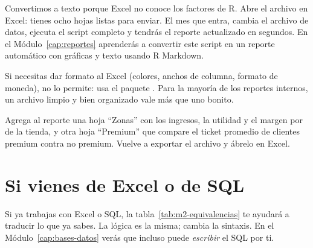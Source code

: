 Convertimos  a texto porque Excel no conoce los factores
de R. Abre el archivo en Excel: tienes ocho hojas listas para enviar. El mes
que entra, cambia el archivo de datos, ejecuta el script completo y tendrás
el reporte actualizado en segundos. En el Módulo~\ref{cap:reportes}
aprenderás a convertir este script en un reporte automático con gráficas y
texto usando R Markdown.

\begin{consejo}
Si necesitas dar formato al Excel (colores, anchos de columna, formato de
moneda),  no lo permite: usa el paquete .
Para la mayoría de los reportes internos, un archivo limpio y bien
organizado vale más que uno bonito.
\end{consejo}

\begin{hazlotu}
Agrega al reporte una hoja ``Zonas'' con los ingresos, la utilidad y el
margen por  de la tienda, y otra hoja ``Premium'' que compare el
ticket promedio de clientes premium contra no premium. Vuelve a exportar el
archivo y ábrelo en Excel.
\end{hazlotu}

\section{Si vienes de Excel o de SQL}
\label{sec:m2-equivalencias}

Si ya trabajas con Excel o SQL, la tabla~\ref{tab:m2-equivalencias} te
ayudará a traducir lo que ya sabes. La lógica es la misma; cambia la
sintaxis. En el Módulo~\ref{cap:bases-datos} verás que 
incluso puede \emph{escribir} el SQL por ti.

